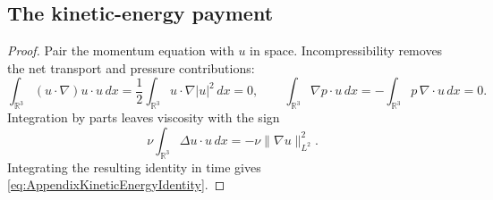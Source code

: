 \subsection{The kinetic-energy payment}

\begin{proof}
Pair the momentum equation with \(u\) in space.  Incompressibility removes
the net transport and pressure contributions:
\[
  \int_{\mathbb R^3}(u\cdot\nabla)u\cdot u\,dx
  =
  \frac12\int_{\mathbb R^3}u\cdot\nabla|u|^2\,dx
  =0,
  \qquad
  \int_{\mathbb R^3}\nabla p\cdot u\,dx
  =-
  \int_{\mathbb R^3}p\,\nabla\cdot u\,dx
  =0.
\]
Integration by parts leaves viscosity with the sign
\[
  \nu\int_{\mathbb R^3}\Delta u\cdot u\,dx
  =-\nu\lVert\nabla u\rVert_{L^2}^2.
\]
Integrating the resulting identity in time gives
\eqref{eq:AppendixKineticEnergyIdentity}.
\end{proof}
